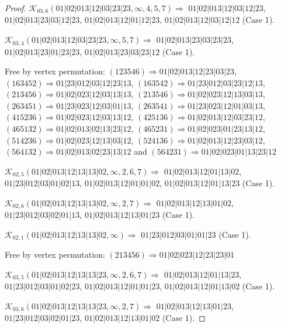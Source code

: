 \documentclass[12pt]{article}
\theoremstyle{plain}
\theoremstyle{definition}
\theoremstyle{remark}
\newcommand{\fancy}[1]{\mathcal{#1}}
\def\K{\fancy{K}}
\begin{document}
\begin{proof}
	
	
	\bigskip
	
	$\K_{03,6}(01|02|013|12|03|23|23,\infty,4, 5, 7)\Rightarrow $ $01|02|013|12|03|12|23$, $01|02|013|23|03|12|23$, $01|02|013|12|01|12|23$, $01|02|013|12|03|12|12$ (Case 1).
	
	$\K_{03,4}(01|02|013|12|03|23|23,\infty,5, 7)\Rightarrow $ $01|02|013|23|03|23|23$, $01|02|013|23|01|23|23$, $01|02|013|23|03|23|12$ (Case 1).
	
	
	
	Free by vertex permutation: $(1 2 3 5 4 6)\Rightarrow 01|02|013|12|23|03|23$, $(1 6 3 4 5 2)\Rightarrow 01|23|012|03|12|23|13$, $(1 6 3 5 4 2)\Rightarrow 01|23|012|03|23|12|13$, $(2 1 3 4 5 6)\Rightarrow 01|02|023|12|03|13|13$, $(2 1 3 5 4 6)\Rightarrow 01|02|023|12|13|03|13$, $(2 6 3 4 5 1)\Rightarrow 01|23|023|12|03|01|13$, $(2 6 3 5 4 1)\Rightarrow 01|23|023|12|01|03|13$, $(4 1 5 2 3 6)\Rightarrow 01|02|023|12|03|13|12$, $(4 2 5 1 3 6)\Rightarrow 01|02|013|12|03|23|12$, $(4 6 5 1 3 2)\Rightarrow 01|02|013|02|13|23|12$, $(4 6 5 2 3 1)\Rightarrow 01|02|023|01|23|13|12$, $(5 1 4 2 3 6)\Rightarrow 01|02|023|12|13|03|12$, $(5 2 4 1 3 6)\Rightarrow 01|02|013|12|23|03|12$, $(5 6 4 1 3 2)\Rightarrow 01|02|013|02|23|13|12$ and $(5 6 4 2 3 1)\Rightarrow 01|02|023|01|13|23|12$
	
	
	
	\bigskip
	
	$\K_{02,5}(01|02|013|12|13|13|02,\infty,2, 6, 7)\Rightarrow $ $01|02|013|12|01|13|02$, $01|23|012|03|01|02|13$, $01|02|013|12|01|01|02$, $01|02|013|12|01|13|23$ (Case 1).
	
	$\K_{02,6}(01|02|013|12|13|13|02,\infty,2, 7)\Rightarrow $ $01|02|013|12|13|01|02$, $01|23|012|03|02|01|13$, $01|02|013|12|13|01|23$ (Case 1).
	
	$\K_{02,1}(01|02|013|12|13|13|02,\infty)\Rightarrow $ $01|23|012|03|01|01|23$ (Case 1).
	
	
	
	Free by vertex permutation: $(2 1 3 4 5 6)\Rightarrow 01|02|023|12|23|23|01$
	
	
	
	\bigskip
	
	$\K_{03,5}(01|02|013|12|13|13|23,\infty,2, 6, 7)\Rightarrow $ $01|02|013|12|01|13|23$, $01|23|012|03|01|02|23$, $01|02|013|12|01|01|23$, $01|02|013|12|01|13|02$ (Case 1).
	
	$\K_{03,6}(01|02|013|12|13|13|23,\infty,2, 7)\Rightarrow $ $01|02|013|12|13|01|23$, $01|23|012|03|02|01|23$, $01|02|013|12|13|01|02$ (Case 1).
	

\end{proof}
\end{document}
